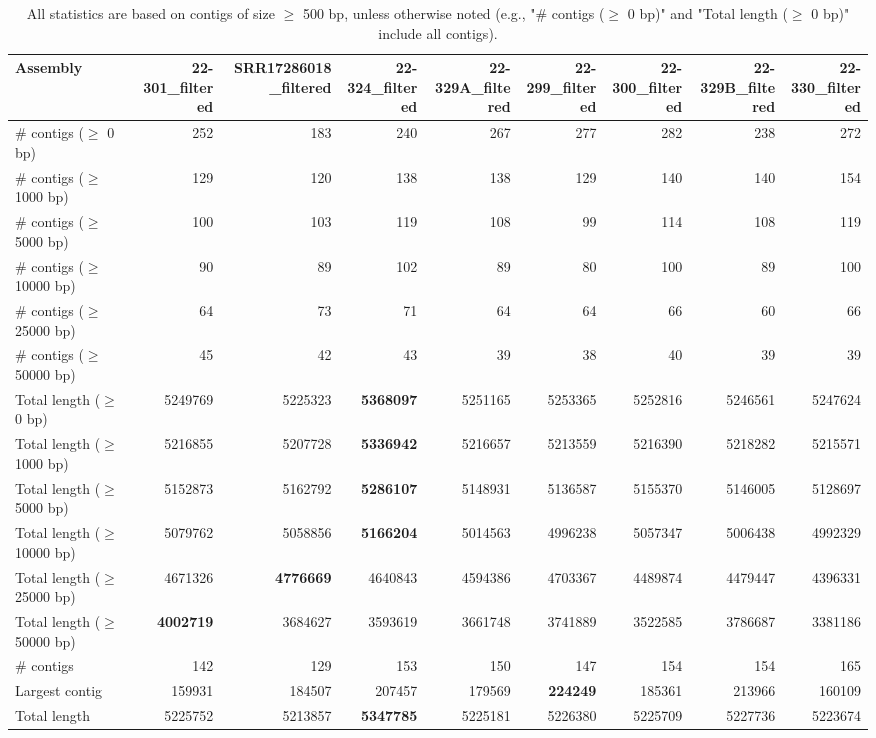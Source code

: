 \documentclass[12pt,a4paper]{article}
\begin{document}
\begin{table}[ht]
\begin{center}
\caption{All statistics are based on contigs of size $\geq$ 500 bp, unless otherwise noted (e.g., "\# contigs ($\geq$ 0 bp)" and "Total length ($\geq$ 0 bp)" include all contigs).}
\begin{tabular}{|l*{8}{|r}|}
\hline
Assembly & 22-301\_filtered & SRR17286018\_filtered & 22-324\_filtered & 22-329A\_filtered & 22-299\_filtered & 22-300\_filtered & 22-329B\_filtered & 22-330\_filtered \\ \hline
\# contigs ($\geq$ 0 bp) & 252 & 183 & 240 & 267 & 277 & 282 & 238 & 272 \\ \hline
\# contigs ($\geq$ 1000 bp) & 129 & 120 & 138 & 138 & 129 & 140 & 140 & 154 \\ \hline
\# contigs ($\geq$ 5000 bp) & 100 & 103 & 119 & 108 & 99 & 114 & 108 & 119 \\ \hline
\# contigs ($\geq$ 10000 bp) & 90 & 89 & 102 & 89 & 80 & 100 & 89 & 100 \\ \hline
\# contigs ($\geq$ 25000 bp) & 64 & 73 & 71 & 64 & 64 & 66 & 60 & 66 \\ \hline
\# contigs ($\geq$ 50000 bp) & 45 & 42 & 43 & 39 & 38 & 40 & 39 & 39 \\ \hline
Total length ($\geq$ 0 bp) & 5249769 & 5225323 & {\bf 5368097} & 5251165 & 5253365 & 5252816 & 5246561 & 5247624 \\ \hline
Total length ($\geq$ 1000 bp) & 5216855 & 5207728 & {\bf 5336942} & 5216657 & 5213559 & 5216390 & 5218282 & 5215571 \\ \hline
Total length ($\geq$ 5000 bp) & 5152873 & 5162792 & {\bf 5286107} & 5148931 & 5136587 & 5155370 & 5146005 & 5128697 \\ \hline
Total length ($\geq$ 10000 bp) & 5079762 & 5058856 & {\bf 5166204} & 5014563 & 4996238 & 5057347 & 5006438 & 4992329 \\ \hline
Total length ($\geq$ 25000 bp) & 4671326 & {\bf 4776669} & 4640843 & 4594386 & 4703367 & 4489874 & 4479447 & 4396331 \\ \hline
Total length ($\geq$ 50000 bp) & {\bf 4002719} & 3684627 & 3593619 & 3661748 & 3741889 & 3522585 & 3786687 & 3381186 \\ \hline
\# contigs & 142 & 129 & 153 & 150 & 147 & 154 & 154 & 165 \\ \hline
Largest contig & 159931 & 184507 & 207457 & 179569 & {\bf 224249} & 185361 & 213966 & 160109 \\ \hline
Total length & 5225752 & 5213857 & {\bf 5347785} & 5225181 & 5226380 & 5225709 & 5227736 & 5223674 \\ \hline

\end{tabular}
\end{center}
\end{table}
\end{document}
